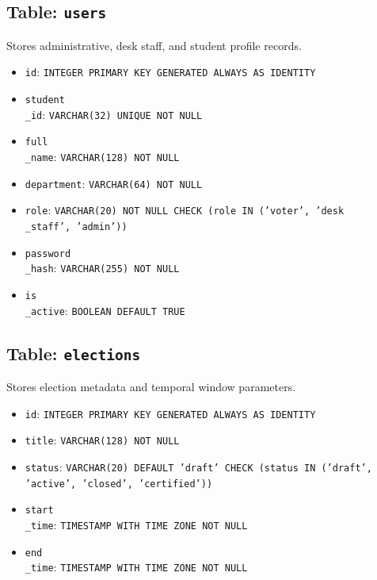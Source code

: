 \documentclass[12pt,a4paper,oneside]{report}
\begin{document}
\subsection{Table: \texttt{users}}
Stores administrative, desk staff, and student profile records.
\begin{itemize}
    \item \texttt{id}: \texttt{INTEGER PRIMARY KEY GENERATED ALWAYS AS IDENTITY}
    \item \texttt{student\\_id}: \texttt{VARCHAR(32) UNIQUE NOT NULL}
    \item \texttt{full\\_name}: \texttt{VARCHAR(128) NOT NULL}
    \item \texttt{department}: \texttt{VARCHAR(64) NOT NULL}
    \item \texttt{role}: \texttt{VARCHAR(20) NOT NULL CHECK (role IN ('voter', 'desk\\_staff', 'admin'))}
    \item \texttt{password\\_hash}: \texttt{VARCHAR(255) NOT NULL}
    \item \texttt{is\\_active}: \texttt{BOOLEAN DEFAULT TRUE}
\end{itemize}

\subsection{Table: \texttt{elections}}
Stores election metadata and temporal window parameters.
\begin{itemize}
    \item \texttt{id}: \texttt{INTEGER PRIMARY KEY GENERATED ALWAYS AS IDENTITY}
    \item \texttt{title}: \texttt{VARCHAR(128) NOT NULL}
    \item \texttt{status}: \texttt{VARCHAR(20) DEFAULT 'draft' CHECK (status IN ('draft', 'active', 'closed', 'certified'))}
    \item \texttt{start\\_time}: \texttt{TIMESTAMP WITH TIME ZONE NOT NULL}
    \item \texttt{end\\_time}: \texttt{TIMESTAMP WITH TIME ZONE NOT NULL}
\end{itemize}
\end{document}
